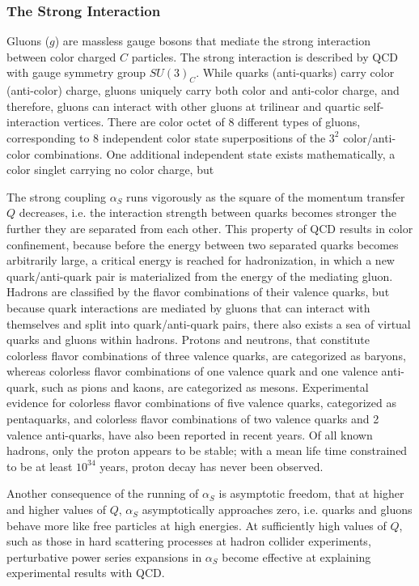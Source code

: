 \subsubsection{The Strong Interaction}
Gluons ($g$) are massless gauge bosons that mediate the strong interaction between color charged $C$ particles.
The strong interaction is described by QCD with gauge symmetry group $SU(3)_C$.
While quarks (anti-quarks) carry color (anti-color) charge, gluons uniquely carry both color and anti-color charge, and therefore, gluons can interact with other gluons at trilinear and quartic self-interaction vertices.
There are color octet of 8 different types of gluons, corresponding to 8 independent color state superpositions of the $3^2$ color/anti-color combinations.
One additional independent state exists mathematically, a color singlet carrying no color charge, but 

The strong coupling $\alpha_S$ runs vigorously as the square of the momentum transfer $Q$ decreases, i.e. the interaction strength between quarks becomes stronger the further they are separated from each other.
This property of QCD results in color confinement, because before the energy between two separated quarks becomes arbitrarily large, a critical energy is reached for hadronization, in which a new quark/anti-quark pair is materialized from the energy of the mediating gluon.
Hadrons are classified by the flavor combinations of their valence quarks, but because quark interactions are mediated by gluons that can interact with themselves and split into quark/anti-quark pairs, there also exists a sea of virtual quarks and gluons within hadrons.
Protons and neutrons, that constitute colorless flavor combinations of three valence quarks, are categorized as baryons, whereas colorless flavor combinations of one valence quark and one valence anti-quark, such as pions and kaons, are categorized as mesons.
Experimental evidence for colorless flavor combinations of five valence quarks, categorized as pentaquarks, and colorless flavor combinations of two valence quarks and 2 valence anti-quarks, have also been reported in recent years.
Of all known hadrons, only the proton appears to be stable; with a mean life time constrained to be at least $10^34$ years, proton decay has never been observed.

Another consequence of the running of $\alpha_S$ is asymptotic freedom, that at higher and higher values of $Q$, $\alpha_S$ asymptotically approaches zero, i.e. quarks and gluons behave more like free particles at high energies.
At sufficiently high values of $Q$, such as those in hard scattering processes at hadron collider experiments, perturbative power series expansions in $\alpha_S$ become effective at explaining experimental results with QCD.

